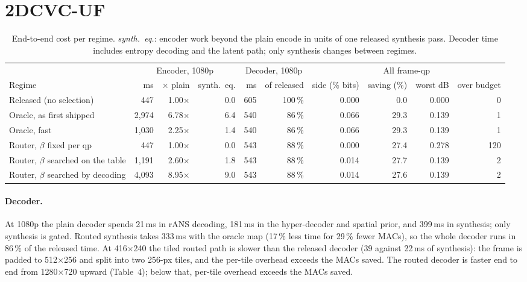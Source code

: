 \documentclass[10pt]{article}
\begin{document}
\section*{2\quad DCVC-UF}
\begin{table}[h]\centering\footnotesize\setlength{\tabcolsep}{3.5pt}
\begin{tabular}{@{}lrrrrrrrrr@{}}\toprule
 & \multicolumn{3}{c}{Encoder, 1080p} & \multicolumn{2}{c}{Decoder, 1080p} & \multicolumn{4}{c}{All frame-qp} \\\cmidrule(lr){2-4}\cmidrule(lr){5-6}\cmidrule(l){7-10}
Regime & ms & $\times$ plain & synth.\ eq. & ms & of released & side (\% bits) & saving (\%) & worst dB & over budget \\\midrule
Released (no selection) & 447 & 1.00$\times$ & 0.0 & 605 & 100\,\% & 0.000 & 0.0 & 0.000 & 0 \\
Oracle, as first shipped & 2,974 & 6.78$\times$ & 6.4 & 540 & 86\,\% & 0.066 & 29.3 & 0.139 & 1 \\
Oracle, fast & 1,030 & 2.25$\times$ & 1.4 & 540 & 86\,\% & 0.066 & 29.3 & 0.139 & 1 \\
Router, $\beta$ fixed per qp & 447 & 1.00$\times$ & 0.0 & 543 & 88\,\% & 0.000 & 27.4 & 0.278 & 120 \\
Router, $\beta$ searched on the table & 1,191 & 2.60$\times$ & 1.8 & 543 & 88\,\% & 0.014 & 27.7 & 0.139 & 2 \\
Router, $\beta$ searched by decoding & 4,093 & 8.95$\times$ & 9.0 & 543 & 88\,\% & 0.014 & 27.6 & 0.139 & 2 \\
\bottomrule\end{tabular}
\caption{End-to-end cost per regime. \emph{synth.\ eq.}: encoder work beyond the plain encode in units of one released synthesis pass. Decoder time includes entropy decoding and the latent path; only synthesis changes between regimes.}\end{table}

\paragraph{Decoder.} At 1080p the plain decoder spends 21\,ms in rANS decoding, 181\,ms in the hyper-decoder and spatial prior, and 399\,ms in synthesis; only synthesis is gated. Routed synthesis takes 333\,ms with the oracle map (17\,\% less time for 29\,\% fewer MACs), so the whole decoder runs in 86\,\% of the released time. At 416$\times$240 the tiled routed path is slower than the released decoder (39 against 22\,ms of synthesis): the frame is padded to 512$\times$256 and split into two 256-px tiles, and the per-tile overhead exceeds the MACs saved. The routed decoder is faster end to end from 1280$\times$720 upward (Table~4); below that, per-tile overhead exceeds the MACs saved.
\end{document}
